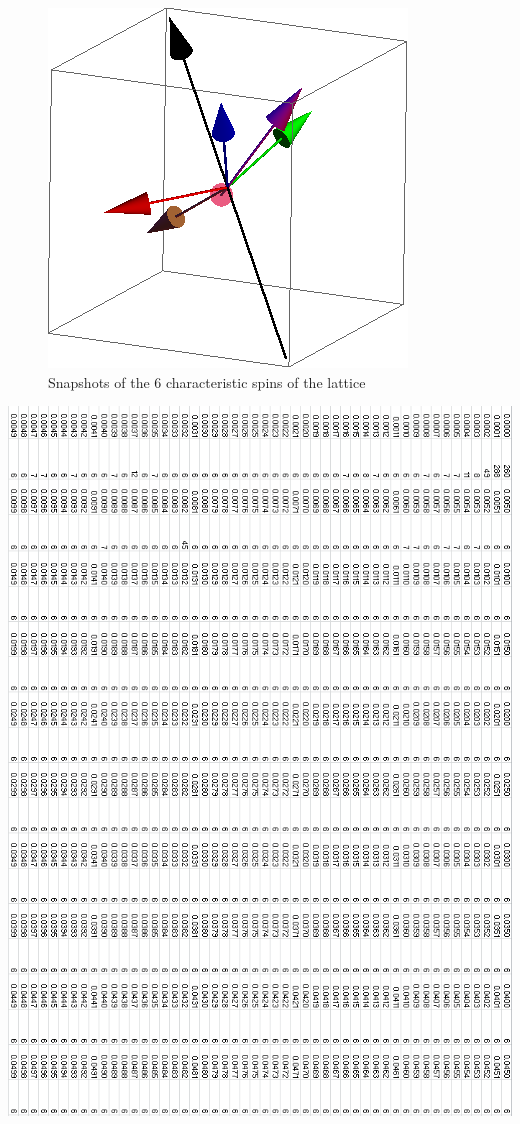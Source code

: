 \documentclass{article}
\begin{document}
\begin{figure}[ht]
\includegraphics[scale=0.27]{111_2000/4S000to005R.png}
\caption{Snapshots of the 6 characteristic spins of the lattice}
\end{figure}
\clearpage

\begin{center}
 \includegraphics[keepaspectratio,scale=0.58]{111_2000/000to005RSpinChart.png}
\end{center}
\end{document}
